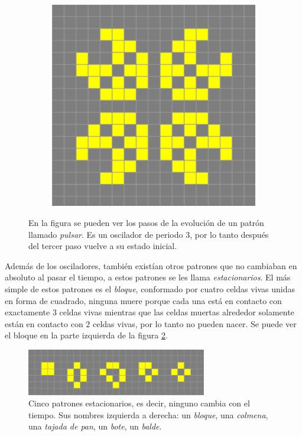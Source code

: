 \begin{figure}[h]
\begin{subfigure}{0.3\textwidth}
    \end{subfigure}
    \begin{subfigure}{0.3\textwidth}
        \includegraphics[width=\textwidth]{images/life-pulsar-3.png}
    \end{subfigure}
    \caption{En la figura se pueden ver los pasos de la evoluci\'on de un patr\'on llamado \textit{pulsar}. Es un oscilador de periodo 3, por lo tanto despu\'es del tercer paso vuelve a su estado inicial.}
    \label{figure:pulsar}
\end{figure}

Adem\'as de los osciladores, tambi\'en exist\'ian otros patrones que no cambiaban en absoluto al pasar el tiempo, a estos patrones se les llama \textit{estacionarios}. El m\'as simple de estos patrones es el \textit{bloque}, conformado por cuatro celdas vivas unidas en forma de cuadrado, ninguna muere porque cada una est\'a en contacto con exactamente $3$ celdas vivas mientras que las celdas muertas alrededor solamente est\'an en contacto con $2$ celdas vivas, por lo tanto no pueden nacer. Se puede ver el bloque en la parte izquierda de la figura \ref{figure:stationary}.

\begin{figure}[b]
    \centering
    \includegraphics[width=0.7\textwidth]{images/life-stationary.png}
    \caption{Cinco patrones estacionarios, es decir, ninguno cambia con el tiempo. Sus nombres izquierda a derecha: un \textit{bloque}, una \textit{colmena}, una \textit{tajada de pan}, un \textit{bote}, un \textit{balde}.}
    \label{figure:stationary}
\end{figure}

